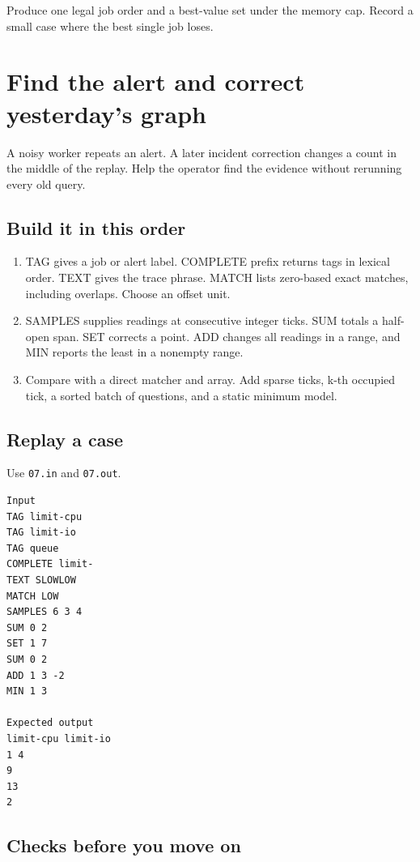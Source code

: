 \documentclass[11pt,letterpaper]{article}
\begin{document}
Produce one legal job order and a best-value set under the memory cap. Record a small case where the best single job loses.

\clearpage

\section{Find the alert and correct yesterday's graph}\label{datacenter:07}

A noisy worker repeats an alert. A later incident correction changes a count in the middle of the replay. Help the operator find the evidence without rerunning every old query.

\subsection*{Build it in this order}

\begin{enumerate}
\item TAG gives a job or alert label. COMPLETE prefix returns tags in lexical order. TEXT gives the trace phrase. MATCH lists zero-based exact matches, including overlaps. Choose an offset unit.
\item SAMPLES supplies readings at consecutive integer ticks. SUM totals a half-open span. SET corrects a point. ADD changes all readings in a range, and MIN reports the least in a nonempty range.
\item Compare with a direct matcher and array. Add sparse ticks, k-th occupied tick, a sorted batch of questions, and a static minimum model.
\end{enumerate}

\subsection*{Replay a case}

Use \texttt{07.in} and \texttt{07.out}.

\begin{samepage}
\small
\begin{verbatim}
Input
TAG limit-cpu
TAG limit-io
TAG queue
COMPLETE limit-
TEXT SLOWLOW
MATCH LOW
SAMPLES 6 3 4
SUM 0 2
SET 1 7
SUM 0 2
ADD 1 3 -2
MIN 1 3

Expected output
limit-cpu limit-io
1 4
9
13
2
\end{verbatim}
\end{samepage}

\subsection*{Checks before you move on}
\end{document}
